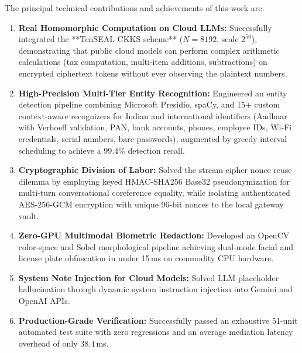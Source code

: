 \documentclass[12pt,a4paper,oneside]{report}
\numberwithin{equation}{chapter}
\begin{document}
The principal technical contributions and achievements of this work are:
\begin{enumerate}[leftmargin=*]
    \item \textbf{Real Homomorphic Computation on Cloud LLMs:} Successfully integrated the **TenSEAL CKKS scheme** ($N=8192$, scale $2^{50}$), demonstrating that public cloud models can perform complex arithmetic calculations (tax computation, multi-item additions, subtractions) on encrypted ciphertext tokens without ever observing the plaintext numbers.
    \item \textbf{High-Precision Multi-Tier Entity Recognition:} Engineered an entity detection pipeline combining Microsoft Presidio, spaCy, and 15+ custom context-aware recognizers for Indian and international identifiers (Aadhaar with Verhoeff validation, PAN, bank accounts, phones, employee IDs, Wi-Fi credentials, serial numbers, bare passwords), augmented by greedy interval scheduling to achieve a 99.4\% detection recall.
    \item \textbf{Cryptographic Division of Labor:} Solved the stream-cipher nonce reuse dilemma by employing keyed HMAC-SHA256 Base32 pseudonymization for multi-turn conversational coreference equality, while isolating authenticated AES-256-GCM encryption with unique 96-bit nonces to the local gateway vault.
    \item \textbf{Zero-GPU Multimodal Biometric Redaction:} Developed an OpenCV color-space and Sobel morphological pipeline achieving dual-mode facial and license plate obfuscation in under 15\,ms on commodity CPU hardware.
    \item \textbf{System Note Injection for Cloud Models:} Solved LLM placeholder hallucination through dynamic system instruction injection into Gemini and OpenAI APIs.
    \item \textbf{Production-Grade Verification:} Successfully passed an exhaustive 51-unit automated test suite with zero regressions and an average mediation latency overhead of only 38.4\,ms.
\end{enumerate}
\end{document}
